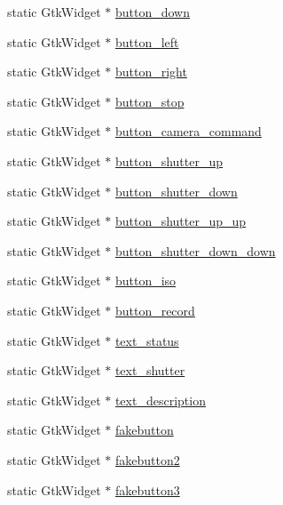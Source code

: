\begin{DoxyCompactItemize}
static Gtk\+Widget $\ast$ \hyperlink{classgtk__class_a709b242e98b6984e63a3469b2b420825}{button\+\_\+down}
\item 
static Gtk\+Widget $\ast$ \hyperlink{classgtk__class_a85b7fc192640e55afb364b3aaba0b0da}{button\+\_\+left}
\item 
static Gtk\+Widget $\ast$ \hyperlink{classgtk__class_a56405f6c6e75af4663741acc1432283c}{button\+\_\+right}
\item 
static Gtk\+Widget $\ast$ \hyperlink{classgtk__class_abf3f76bf2b007424210c597d954e7128}{button\+\_\+stop}
\item 
static Gtk\+Widget $\ast$ \hyperlink{classgtk__class_a3cb8e7ae140ae9c1b251f47aa70b570a}{button\+\_\+camera\+\_\+command}
\item 
static Gtk\+Widget $\ast$ \hyperlink{classgtk__class_ac9244ecad7ca4980e6744d333d623531}{button\+\_\+shutter\+\_\+up}
\item 
static Gtk\+Widget $\ast$ \hyperlink{classgtk__class_a5a16623a8e86c902492da7a2623ba7ed}{button\+\_\+shutter\+\_\+down}
\item 
static Gtk\+Widget $\ast$ \hyperlink{classgtk__class_ae7baa3e70983464d83caad8045f84111}{button\+\_\+shutter\+\_\+up\+\_\+up}
\item 
static Gtk\+Widget $\ast$ \hyperlink{classgtk__class_aa65822395ff08ca84df030062ff89c7f}{button\+\_\+shutter\+\_\+down\+\_\+down}
\item 
static Gtk\+Widget $\ast$ \hyperlink{classgtk__class_a2c851f4a856bc05adbeafa3ea9e9d321}{button\+\_\+iso}
\item 
static Gtk\+Widget $\ast$ \hyperlink{classgtk__class_a3b4676bf0e1502cf55fa859a338370ba}{button\+\_\+record}
\item 
static Gtk\+Widget $\ast$ \hyperlink{classgtk__class_a573da740beee14061237c96c9ede3cce}{text\+\_\+status}
\item 
static Gtk\+Widget $\ast$ \hyperlink{classgtk__class_a4150b41f2082f6827ba92cc14068e518}{text\+\_\+shutter}
\item 
static Gtk\+Widget $\ast$ \hyperlink{classgtk__class_a47995d83c3d5a3d2161361d5535c01ac}{text\+\_\+description}
\item 
static Gtk\+Widget $\ast$ \hyperlink{classgtk__class_a789555757e3a97cbf2208f9809737ba4}{fakebutton}
\item 
static Gtk\+Widget $\ast$ \hyperlink{classgtk__class_a8216a6db2ab7846b766bf1d6b476c968}{fakebutton2}
\item 
static Gtk\+Widget $\ast$ \hyperlink{classgtk__class_ad93a15c3ca9c2a605405ca967b99d8d3}{fakebutton3}

\end{DoxyCompactItemize}

